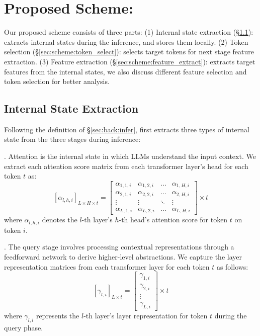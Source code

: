 \section{Proposed Scheme: \sysname}\label{sec:scheme}


Our proposed scheme consists of three parts:
(1) Internal state extraction (\S\ref{sec:scheme:state_extract}): \sysname extracts internal states during the inference, and stores them locally.
(2) Token selection (\S\ref{sec:scheme:token_select}): \sysname selects target tokens for next stage feature extraction.
(3) Feature extraction (\S\ref{sec:scheme:feature_extract}): \sysname extracts target features from the internal states, we also discuss different feature selection and token selection for better analysis.

\subsection{Internal State Extraction}\label{sec:scheme:state_extract}

Following the definition of \S\ref{sec:back:infer}, \sysname first extracts three types of internal state from the three stages during inference:

.
Attention is the internal state in which LLMs understand the input context.
We extract each attention score matrix from each transformer layer's head for each token $t$ as:
\begin{equation}
    \left[ \alpha_{l,h,i} \right]_{L \times H \times t}=\begin{bmatrix}
    \alpha_{1,1,i} & \alpha_{1,2,i} & \dots & \alpha_{1,H,i} \\
    \alpha_{2,1,i} & \alpha_{2,2,i} & \dots & \alpha_{2,H,i} \\
    \vdots & \vdots & \ddots & \vdots \\
    \alpha_{L,1,i} & \alpha_{L,2,i} & \dots & \alpha_{L,H,i}
    \end{bmatrix}\times t
\end{equation}
where ${\alpha}_{l,h,i}$ denotes the $l$-th layer's $h$-th head's attention score for token $t$ on token $i$.

.
The query stage involves processing contextual representations through a feedforward network to derive higher-level abstractions. We capture the layer representation matrices from each transformer layer for each token \( t \) as follows:
\begin{equation}
    \left[ \gamma _{l,i} \right]_{L \times t}=\begin{bmatrix}
    \gamma _{1,i} \\
    \gamma _{2,i} \\
    \vdots \\
    \gamma _{L,i}
    \end{bmatrix}\times t
\end{equation}
where \( \gamma _{l,i} \) represents the \( l \)-th layer's layer representation for token \( t \) during the query phase.

